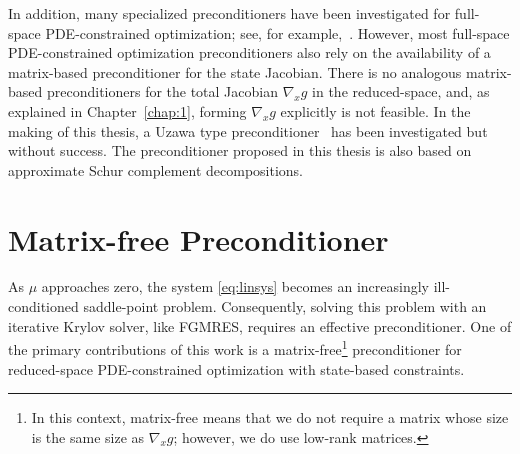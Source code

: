 In addition, many specialized preconditioners have been investigated for full-space PDE-constrained optimization; see, for example,~\cite{Rees2010optimal}.
However, most full-space PDE-constrained optimization preconditioners also rely on
the availability of a matrix-based preconditioner for the state Jacobian. There
is no analogous matrix-based preconditioners for the total Jacobian $\nabla_x g$
in the reduced-space, and, as explained in Chapter~\ref{chap:1}, forming $\nabla_x
g$ explicitly is not feasible. In the making of this thesis, a Uzawa type 
preconditioner~\cite{Hu_uzawa} has been investigated but without success. 
The preconditioner proposed in this thesis is also based on approximate Schur complement decompositions. 



\section{Matrix-free Preconditioner}\label{sec:matfreepc}
As $\mu$ approaches zero, the system \eqref{eq:linsys} becomes an increasingly
ill-conditioned saddle-point problem.  Consequently, solving this problem with
an iterative Krylov solver, like FGMRES, requires an effective preconditioner.  
 One of the primary contributions of
this work is a matrix-free\footnote{In this context, matrix-free means that we
  do not require a matrix whose size is the same size as $\nabla_x g$; however,
  we do use low-rank matrices.} preconditioner for reduced-space PDE-constrained
optimization with state-based constraints.

